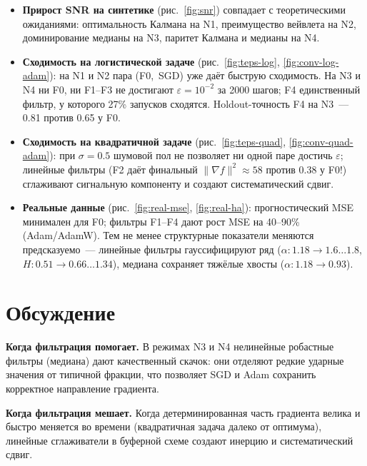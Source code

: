 \documentclass[conference]{IEEEtran}
\begin{document}
\begin{itemize}
  \item \textbf{Прирост SNR на синтетике} (рис.~\ref{fig:snr}) совпадает
        с теоретическими ожиданиями: оптимальность Калмана на N1,
        преимущество вейвлета на N2, доминирование медианы на N3,
        паритет Калмана и медианы на N4.

  \item \textbf{Сходимость на логистической задаче}
        (рис.~\ref{fig:teps-log}, \ref{fig:conv-log-adam}): на N1 и N2
        пара (F0,~SGD) уже даёт быструю сходимость. На N3 и N4 ни F0, ни
        F1--F3 не достигают $\varepsilon=10^{-2}$ за 2000 шагов; F4
        единственный фильтр, у которого 27\% запусков сходятся.
        Holdout-точность F4 на N3~--- 0.81 против 0.65 у F0.

  \item \textbf{Сходимость на квадратичной задаче}
        (рис.~\ref{fig:teps-quad}, \ref{fig:conv-quad-adam}): при
        $\sigma=0.5$ шумовой пол не позволяет ни одной паре достичь
        $\varepsilon$; линейные фильтры (F2 даёт финальный
        $\|\nabla f\|^2\approx58$ против 0.38 у F0!) сглаживают
        сигнальную компоненту и создают систематический сдвиг.

  \item \textbf{Реальные данные} (рис.~\ref{fig:real-mse},
        \ref{fig:real-ha}): прогностический MSE минимален для F0;
        фильтры F1--F4 дают рост MSE на 40--90\% (Adam/AdamW). Тем не
        менее структурные показатели меняются предсказуемо~--- линейные
        фильтры гауссифицируют ряд ($\alpha: 1.18\to1.6\dots1.8$,
        $H: 0.51\to0.66\dots1.34$), медиана сохраняет тяжёлые хвосты
        ($\alpha: 1.18\to0.93$).
\end{itemize}

\section{Обсуждение}

\textbf{Когда фильтрация помогает.} В режимах N3 и N4 нелинейные
робастные фильтры (медиана) дают качественный скачок: они отделяют редкие
ударные значения от типичной фракции, что позволяет SGD и Adam сохранить
корректное направление градиента.

\textbf{Когда фильтрация мешает.} Когда детерминированная часть
градиента велика и быстро меняется во времени (квадратичная задача
далеко от оптимума), линейные сглаживатели в буферной схеме создают
инерцию и систематический сдвиг.
\end{document}
